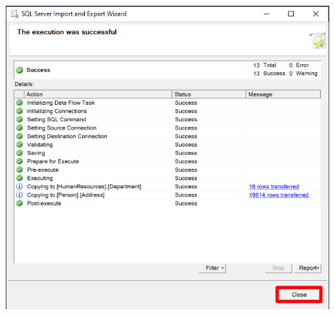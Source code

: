 \documentclass[12pt,letterpaper]{article}
\begin{document}
	\begin{center}
	\includegraphics[width=12cm]{./img/11}
	\end{center}	
\end{document}
